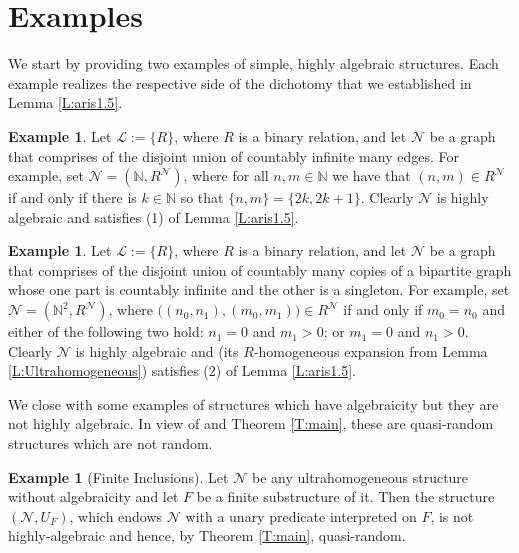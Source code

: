 \documentclass[11pt]{amsart}
\theoremstyle{plain}
\theoremstyle{definition}
\newtheorem{example}[theorem]{Example}
\begin{document}
\section{Examples}

We start by providing two examples of simple, highly algebraic structures. Each  example  realizes the respective side of the dichotomy that we established in Lemma \ref{L:aris1.5}.


\begin{example}\label{Ex:1}
Let $\mathcal{L}:=\{R\}$, where $R$ is a binary relation, and let $\mathcal{N}$ be a graph that comprises of the disjoint union of countably infinite many edges. For example, set $\mathcal{N}=(\mathbb{N},R^{\mathcal{N}})$, where for all $n,m\in\mathbb{N}$ we have that $(n,m)\in R^{\mathcal{N}}$ if and only if there is  $k\in\mathbb{N}$ so that $\{n,m\}=\{2k,2k+1\}$. Clearly $\mathcal{N}$ is highly algebraic and satisfies  (1) of Lemma \ref{L:aris1.5}. 
\end{example}


\begin{example}\label{Ex:2}
Let $\mathcal{L}:=\{R\}$, where $R$ is a binary relation, and let $\mathcal{N}$ be a graph that comprises of the disjoint union of countably many copies of a bipartite  graph whose one part is countably infinite and the other is a singleton.  For example, set $\mathcal{N}=(\mathbb{N}^2,R^{\mathcal{N}})$, where $\big((n_0,n_1),(m_0,m_1)\big)\in R^{\mathcal{N}}$ if and only if   $m_0=n_0$ and either of the following two hold: $n_1=0$ and $m_1>0$; or $m_1=0$ and $n_1>0$.  Clearly $\mathcal{N}$ is highly algebraic and (its $R$-homogeneous expansion from Lemma \ref{L:Ultrahomogeneous}) satisfies  (2) of Lemma \ref{L:aris1.5}. 
\end{example}



We close with some examples of structures which have algebraicity but they are not highly algebraic. In view of  \cite{AFP} and Theorem \ref{T:main}, these are quasi-random structures which are not random.


\begin{example}[Finite Inclusions]
Let $\mathcal{N}$ be any ultrahomogeneous structure without algebraicity and let $F$ be a finite substructure of it. Then the structure $(\mathcal{N},U_F)$, which endows $\mathcal{N}$  with a unary predicate interpreted on $F$, is not highly-algebraic and hence, by Theorem \ref{T:main}, quasi-random. 
\end{example}
\end{document}
